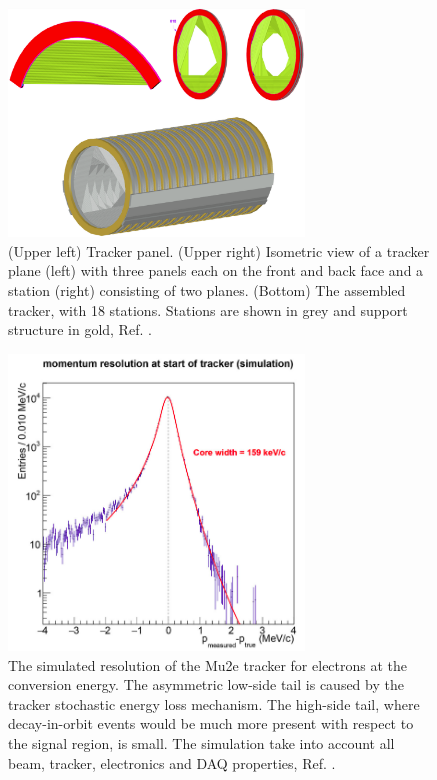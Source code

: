 \begin{figure}[!h]
\centering
\includegraphics[width =0.7\textwidth]{figures/png/Screenshot_20240306_222803.png}
\caption{(Upper left) Tracker panel. (Upper right) Isometric view 
of a tracker plane (left) with three panels each on the front and 
back face and a station (right) consisting of two planes. (Bottom) 
The assembled tracker, with 18 stations. Stations are shown in 
grey and support structure in gold, Ref. \cite{bartoszek2015mu2e}.}
\label{fig:trkpanel}
\end{figure}
\begin{figure}[!h]
    \centering
    \includegraphics[width =0.7\textwidth]{figures/png/Screenshot_20240330_104830.png}
    \caption{The simulated resolution of the Mu2e tracker for electrons at the
    conversion energy. The asymmetric low-side tail is caused by the tracker 
    stochastic energy loss mechanism. The high-side tail, where decay-in-orbit 
    events would be much more present with respect to the signal region, is small. 
    The simulation take into account all beam, tracker, electronics and DAQ 
    properties, Ref. \cite{bobbb}.}
    \label{fig:trkres}
    \end{figure}
